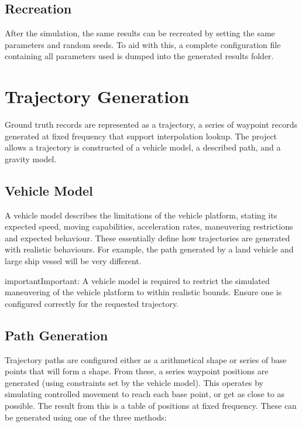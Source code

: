 \documentclass[letterpaper,10pt,english]{sphinxmanual}
\begin{document}
\subsection{Recreation}
\label{\detokenize{usage/technical:recreation}}
\sphinxAtStartPar
After the simulation, the same results can be recreated by setting the same parameters and random seeds. To aid with
this, a complete configuration file containing all parameters used is dumped into the generated results folder.

\sphinxstepscope


\section{Trajectory Generation}
\label{\detokenize{usage/trajectory:trajectory-generation}}\label{\detokenize{usage/trajectory::doc}}
\sphinxAtStartPar
Ground truth records are represented as a trajectory, a series of waypoint records generated at fixed frequency that
support interpolation look\sphinxhyphen{}up. The project allows a trajectory is constructed of a vehicle model, a described path,
and a gravity model.


\subsection{Vehicle Model}
\label{\detokenize{usage/trajectory:vehicle-model}}
\sphinxAtStartPar
A vehicle model describes the limitations of the vehicle platform, stating its expected speed, moving capabilities,
acceleration rates, maneuvering restrictions and expected behaviour. These essentially define how trajectories are
generated with realistic behaviours. For example, the path generated by a land vehicle and large ship vessel will
be very different.

\begin{sphinxadmonition}{important}{Important:}
\sphinxAtStartPar
A vehicle model is required to restrict the simulated maneuvering of the vehicle platform to within realistic
bounds. Ensure one is configured correctly for the requested trajectory.
\end{sphinxadmonition}


\subsection{Path Generation}
\label{\detokenize{usage/trajectory:path-generation}}
\sphinxAtStartPar
Trajectory paths are configured either as a arithmetical shape or series of base points that will form a shape.
From these, a series waypoint positions are generated (using constraints set by the vehicle model). This operates by
simulating controlled movement to reach each base point, or get as close to as possible. The result from this is a
table of positions at fixed frequency. These can be generated using one of the three methods:
\end{document}

